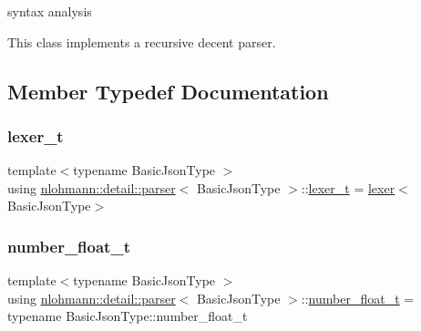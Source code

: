 syntax analysis 

This class implements a recursive decent parser. 

\subsection{Member Typedef Documentation}
\mbox{\label{classnlohmann_1_1detail_1_1parser_a16030c5af158a94d1c799f82ff3a0147}} 
\subsubsection{\texorpdfstring{lexer\+\_\+t}{lexer\_t}}
{\footnotesize\ttfamily template$<$typename Basic\+Json\+Type $>$ \\
using \hyperlink{classnlohmann_1_1detail_1_1parser}{nlohmann\+::detail\+::parser}$<$ Basic\+Json\+Type $>$\+::\hyperlink{classnlohmann_1_1detail_1_1parser_a16030c5af158a94d1c799f82ff3a0147}{lexer\+\_\+t} =  \hyperlink{classnlohmann_1_1detail_1_1lexer}{lexer}$<$Basic\+Json\+Type$>$\hspace{0.3cm}{\ttfamily [private]}}

\mbox{\label{classnlohmann_1_1detail_1_1parser_a8ca8e734da0632c2731fc3b9547dcf28}} 
\subsubsection{\texorpdfstring{number\+\_\+float\+\_\+t}{number\_float\_t}}
{\footnotesize\ttfamily template$<$typename Basic\+Json\+Type $>$ \\
using \hyperlink{classnlohmann_1_1detail_1_1parser}{nlohmann\+::detail\+::parser}$<$ Basic\+Json\+Type $>$\+::\hyperlink{classnlohmann_1_1detail_1_1parser_a8ca8e734da0632c2731fc3b9547dcf28}{number\+\_\+float\+\_\+t} =  typename Basic\+Json\+Type\+::number\+\_\+float\+\_\+t\hspace{0.3cm}{\ttfamily [private]}}

\mbox{\label{classnlohmann_1_1detail_1_1parser_aa0362897269e0a7e50ae07be05f42d8e}} 
